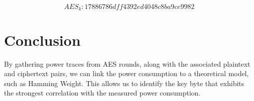 \documentclass[12pt, letterpaper, oneside]{report}
\begin{document}
$$AES_k: 17886786dff4392ed4048c8ba9ce9982$$

\chapter{Conclusion}

By gathering power traces from AES rounds, along with the associated plaintext and ciphertext pairs, we can link the power consumption to a theoretical model, such as Hamming Weight. This allows us to identify the key byte that exhibits the strongest correlation with the measured power consumption. \\ 
\end{document}
